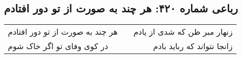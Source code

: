 \begin{center}
\section*{رباعی شماره ۴۲۰: هر چند به صورت از تو دور افتادم}
\label{sec:sh420}
\begin{longtable}{l p{0.5cm} r}
هر چند به صورت از تو دور افتادم
&&
زنهار مبر ظن که شدی از یادم
\\
در کوی وفای تو اگر خاک شوم
&&
زانجا نتواند که رباید بادم
\\
\end{longtable}
\end{center}
